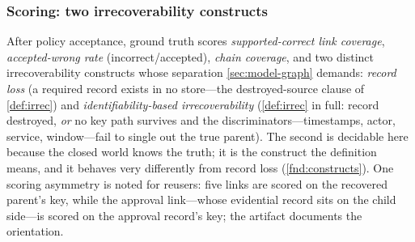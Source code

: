 \subsubsection{Scoring: two irrecoverability constructs}
After policy acceptance, ground truth scores \emph{supported-correct link coverage},
\emph{accepted-wrong rate} (incorrect/accepted), \emph{chain coverage}, and two distinct irrecoverability
constructs whose separation \cref{sec:model-graph} demands: \emph{record loss}
(a required record exists in no store---the destroyed-source clause of
\cref{def:irrec}) and \emph{identifiability-based irrecoverability}
(\cref{def:irrec} in full: record destroyed, \emph{or} no key path survives and
the discriminators---timestamps, actor, service, window---fail to single out
the true parent). The second is decidable here because the closed world knows
the truth; it is the construct the definition means, and it behaves very
differently from record loss (\cref{fnd:constructs}). One scoring asymmetry is
noted for reusers: five links are scored on the recovered parent's key, while
the approval link---whose evidential record sits on the child side---is scored
on the approval record's key; the artifact documents the orientation.

